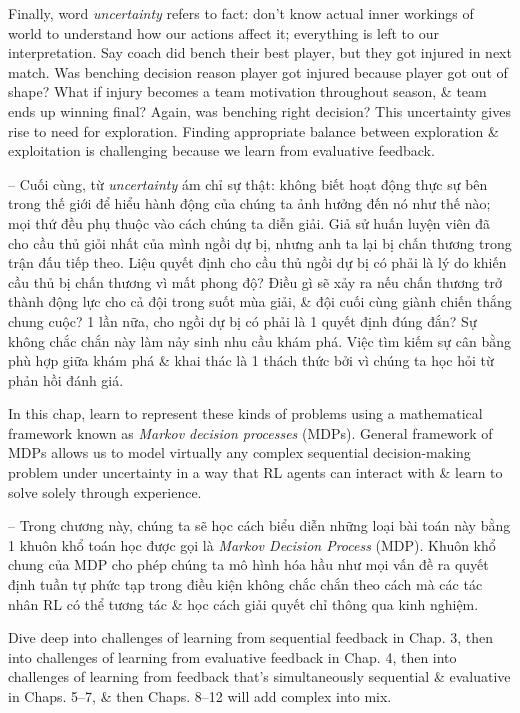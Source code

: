 \documentclass{article}
\begin{document}
\begin{itemize}
    Finally, word {\it uncertainty} refers to fact: don't know actual inner workings of world to understand how our actions affect it; everything is left to our interpretation. Say coach did bench their best player, but they got injured in next match. Was benching decision reason player got injured because player got out of shape? What if injury becomes a team motivation throughout season, \& team ends up winning final? Again, was benching right decision? This uncertainty gives rise to need for exploration. Finding appropriate balance between exploration \& exploitation is challenging because we learn from evaluative feedback.

    -- Cuối cùng, từ {\it uncertainty} ám chỉ sự thật: không biết hoạt động thực sự bên trong thế giới để hiểu hành động của chúng ta ảnh hưởng đến nó như thế nào; mọi thứ đều phụ thuộc vào cách chúng ta diễn giải. Giả sử huấn luyện viên đã cho cầu thủ giỏi nhất của mình ngồi dự bị, nhưng anh ta lại bị chấn thương trong trận đấu tiếp theo. Liệu quyết định cho cầu thủ ngồi dự bị có phải là lý do khiến cầu thủ bị chấn thương vì mất phong độ? Điều gì sẽ xảy ra nếu chấn thương trở thành động lực cho cả đội trong suốt mùa giải, \& đội cuối cùng giành chiến thắng chung cuộc? 1 lần nữa, cho ngồi dự bị có phải là 1 quyết định đúng đắn? Sự không chắc chắn này làm nảy sinh nhu cầu khám phá. Việc tìm kiếm sự cân bằng phù hợp giữa khám phá \& khai thác là 1 thách thức bởi vì chúng ta học hỏi từ phản hồi đánh giá.

    In this chap, learn to represent these kinds of problems using a mathematical framework known as {\it Markov decision processes} (MDPs). General framework of MDPs allows us to model virtually any complex sequential decision-making problem under uncertainty  in a way that RL agents can interact with \& learn to solve solely through experience.

    -- Trong chương này, chúng ta sẽ học cách biểu diễn những loại bài toán này bằng 1 khuôn khổ toán học được gọi là {\it Markov Decision Process} (MDP). Khuôn khổ chung của MDP cho phép chúng ta mô hình hóa hầu như mọi vấn đề ra quyết định tuần tự phức tạp trong điều kiện không chắc chắn theo cách mà các tác nhân RL có thể tương tác \& học cách giải quyết chỉ thông qua kinh nghiệm.

    Dive deep into challenges of learning from sequential feedback in Chap. 3, then into challenges of learning from evaluative feedback in Chap. 4, then into challenges of learning from feedback that's simultaneously sequential \& evaluative in Chaps. 5--7, \& then Chaps. 8--12 will add complex into mix.


\end{itemize}
\end{document}
